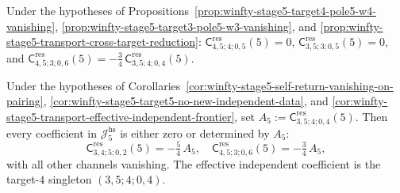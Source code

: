 \begin{corollary}
\label{cor:winfty-stage5-transport-effective-independent-frontier}
Under the hypotheses of
Propositions~\ref{prop:winfty-stage5-target4-pole5-w4-vanishing},
\ref{prop:winfty-stage5-target3-pole5-w3-vanishing}, and
\ref{prop:winfty-stage5-transport-cross-target-reduction}:
$\mathsf{C}^{\mathrm{res}}_{4,5;4;0,5}(5)=0$,
$\mathsf{C}^{\mathrm{res}}_{3,5;3;0,5}(5)=0$, and
$\mathsf{C}^{\mathrm{res}}_{4,5;3;0,6}(5)
=
-\frac{3}{4}\,
\mathsf{C}^{\mathrm{res}}_{3,5;4;0,4}(5)$.
\end{corollary}

\begin{corollary}
\label{cor:winfty-stage5-effective-independent-frontier}
Under the hypotheses of
Corollaries~\ref{cor:winfty-stage5-self-return-vanishing-on-pairing},
\ref{cor:winfty-stage5-target5-no-new-independent-data}, and
\ref{cor:winfty-stage5-transport-effective-independent-frontier},
set $A_5:=\mathsf{C}^{\mathrm{res}}_{3,5;4;0,4}(5)$.
Then every coefficient in $\mathcal{J}_5^{\mathrm{hs}}$ is either zero or determined by $A_5$:
\[
\mathsf{C}^{\mathrm{res}}_{3,4;5;0,2}(5)=-\tfrac{5}{4}\,A_5,
\quad
\mathsf{C}^{\mathrm{res}}_{4,5;3;0,6}(5)=-\tfrac{3}{4}\,A_5,
\]
with all other channels vanishing.
The effective independent coefficient is the target-$4$
singleton \((3,5;4;0,4)\).
\end{corollary}

